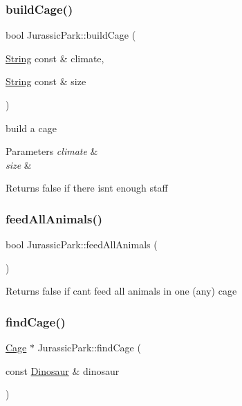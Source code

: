 \subsubsection{\texorpdfstring{build\+Cage()}{buildCage()}}
{\footnotesize\ttfamily bool Jurassic\+Park\+::build\+Cage (\begin{DoxyParamCaption}\item[{\hyperlink{classString}{String} const \&}]{climate,  }\item[{\hyperlink{classString}{String} const \&}]{size }\end{DoxyParamCaption})}

build a cage 
\begin{DoxyParams}{Parameters}
{\em climate} & \\
\hline
{\em size} & \\
\hline
\end{DoxyParams}
\begin{DoxyReturn}{Returns}
false if there isn\textquotesingle{}t enough staff 
\end{DoxyReturn}
\mbox{\label{classJurassicPark_af19a3800b00cf1d9b96d2e334bc95fb4}} 
\subsubsection{\texorpdfstring{feed\+All\+Animals()}{feedAllAnimals()}}
{\footnotesize\ttfamily bool Jurassic\+Park\+::feed\+All\+Animals (\begin{DoxyParamCaption}{ }\end{DoxyParamCaption})}

\begin{DoxyReturn}{Returns}
false if can\textquotesingle{}t feed all animals in one (any) cage 
\end{DoxyReturn}
\mbox{\label{classJurassicPark_af96203bbb3eea734f56ca1c0e61904a8}} 
\subsubsection{\texorpdfstring{find\+Cage()}{findCage()}}
{\footnotesize\ttfamily \hyperlink{classCage}{Cage} $\ast$ Jurassic\+Park\+::find\+Cage (\begin{DoxyParamCaption}\item[{const \hyperlink{classDinosaur}{Dinosaur} \&}]{dinosaur }\end{DoxyParamCaption})\hspace{0.3cm}{\ttfamily [private]}}

